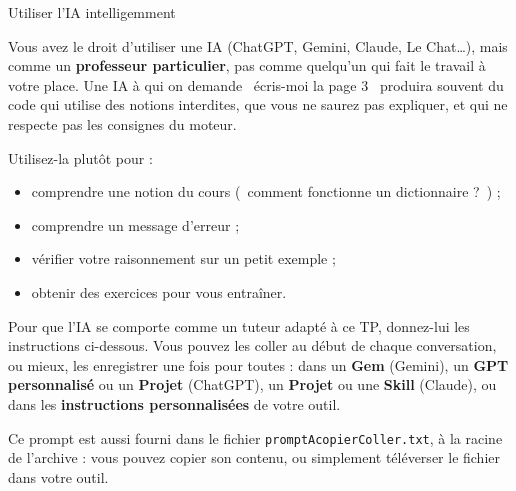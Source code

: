 \documentclass[11pt,a4paper]{article}
\makeatletter
\renewcommand\section{\@startsection{section}{1}{0pt}{1.6em}{0.8em}%
  {\Large\bfseries\color{nuit}}}
\newcommand{\guil}[1]{\guillemotleft~#1~\guillemotright}
\newcommand{\fichier}[1]{\texttt{\color{nuit}#1}}
\makeatother
\begin{document}
\newpage
\section{Utiliser l'IA intelligemment}\label{sec:ia}

Vous avez le droit d'utiliser une IA (ChatGPT, Gemini, Claude, Le Chat\dots), mais comme un
\textbf{professeur particulier}, pas comme quelqu'un qui fait le travail à votre place.
Une IA à qui on demande \guil{écris-moi la page 3} produira souvent du code qui utilise
des notions interdites, que vous ne saurez pas expliquer, et qui ne respecte pas les
consignes du moteur.

Utilisez-la plutôt pour :
\begin{itemize}
  \item comprendre une notion du cours (\guil{comment fonctionne un dictionnaire ?}) ;
  \item comprendre un message d'erreur ;
  \item vérifier votre raisonnement sur un petit exemple ;
  \item obtenir des exercices pour vous entraîner.
\end{itemize}

Pour que l'IA se comporte comme un tuteur adapté à ce TP, donnez-lui les instructions
ci-dessous. Vous pouvez les coller au début de chaque conversation, ou mieux, les
enregistrer une fois pour toutes : dans un \textbf{Gem} (Gemini), un \textbf{GPT
personnalisé} ou un \textbf{Projet} (ChatGPT), un \textbf{Projet} ou une \textbf{Skill}
(Claude), ou dans les \textbf{instructions personnalisées} de votre outil.

Ce prompt est aussi fourni dans le fichier \fichier{promptAcopierColler.txt}, à la racine
de l'archive : vous pouvez copier son contenu, ou simplement téléverser le fichier dans
votre outil.
\end{document}
